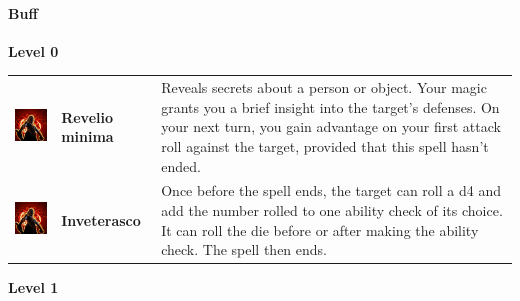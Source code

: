 \paragraph{Buff} 
\textbf{Level 0 } 
\begin{tabular}{ m{4cm}m{3cm}m{6cm} } 
	\includegraphics[width=4cm]{../Pictures/Gameplay/Spells/Icon/spell_icon.png} & \textbf{Revelio minima} & Reveals secrets about a person or object. Your magic grants you a brief insight into the target's defenses. On your next turn, you gain advantage on your first attack roll against the target, provided that this spell hasn't ended. \\ 
   \includegraphics[width=4cm]{../Pictures/Gameplay/Spells/Icon/spell_icon.png} & \textbf{Inveterasco} & Once before the spell ends, the target can roll a d4 and add the number rolled to one ability check of its choice. It can roll the die before or after making the ability check. The spell then ends. \\ %
\end{tabular}
\textbf{Level 1} 
